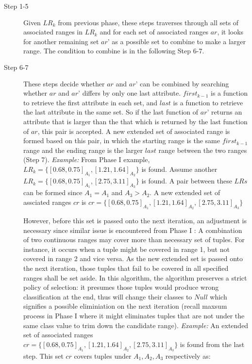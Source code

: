 \begin{description}
\item[Step 1-5] Given $LR_k$ from previous phase, these steps traverses through all sets of associated ranges in $LR_k$ and for each set of associated ranges $ar$, it looks for another remaining set $ar’$ as a possible set to combine to make a larger range. The condition to combine is in the following Step 6-7. \\

\item[Step 6-7] These steps decide whether $ar$ and $ar’$ can be combined by searching whether $ar$ and $ar’$ differs by only one last attribute. $first_{k-1}$ is a function to retrieve the first attribute in each set, and $last$ is a function to retrieve the last attribute in the same set. So if the last function of $ar’$ returns an attribute that is larger than the that which is returned by the last function of $ar$, this pair is accepted. A new extended set of associated range is formed based on this pair, in which the starting range is the same $first_{k-1}$ range and the ending range is the larger $last$ range between the two ranges (Step 7). 
\textit{Example: } From Phase I example, $LR_k = \{[0.68, 0.75]_{A_1}, [1.21,1.64]_{A_2}\}$ is found. Assume another $LR_k = \{[0.68, 0.75]_{A_1}, [2.75,3.11]_{A_3}\}$ is found. A pair between these $LRs$ can be formed since $A_1 = A_1$ and $A_3 > A_2$. A new extended set of assciated ranges $cr$ is
$cr = \{[0.68, 0.75]_{A_1}, [1.21,1.64]_{A_2}, [2.75,3.11]_{A_3}\}$

However, before this set is passed onto the next iteration, an adjustment is necessary since similar issue is encountered from Phase I : A combination of two continuous ranges may cover more than necessary set of tuples. For instance, it occurs when a tuple might be covered in range 1, but not covered in range 2 and vice versa. As the new extended set is passed onto the next iteration, those tuples that fail to be covered in all specified ranges shall be set aside. In this algorithm, the algorithm preserves a strict policy of selection: it presumes those tuples would produce wrong classification at the end, thus will change their classes to $Null$ which signifies a possible eliminiation on the next iteration (recall maxsum process in Phase I where it might eliminates tuples that are not under the same class value to trim down the candidate range).
\textit{Example: } An extended set of associated ranges $cr = \{[0.68, 0.75]_{A_1}, [1.21,1.64]_{A_2}, [2.75,3.11]_{A_3}\}$ is found from the last step. This set $cr$ covers tuples under $A_1, A_2, A_3$ respectively as:


\end{description}
